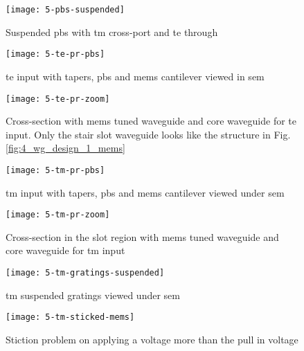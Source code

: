 \documentclass[../report.tex]{subfiles}
\begin{document}
\begin{figure}[H] %
	\centering
	\texttt{[image: 5-pbs-suspended]}
	\caption{Suspended \gls{pbs} with \gls{tm} cross-port and \gls{te} through}
	\label{fig:5-pbs-suspended}
\end{figure}

\begin{figure}[H] %
	\centering
	\texttt{[image: 5-te-pr-pbs]}
	\caption{\gls{te} input with tapers, \gls{pbs} and \gls{mems} cantilever viewed in \gls{sem}}
	\label{fig:5_te_pr_pbs}
\end{figure}

\begin{figure}[H] %
	\centering
	\texttt{[image: 5-te-pr-zoom]}
	\caption{Cross-section with \gls{mems} tuned waveguide and core waveguide for \gls{te} input. Only the stair slot waveguide looks like the structure in Fig. \ref{fig:4_wg_design_1_mems}}
	\label{fig:5_te_pr_zoom}
\end{figure}

\begin{figure}[H] %
	\centering
	\texttt{[image: 5-tm-pr-pbs]}
	\caption{\gls{tm} input with tapers, \gls{pbs} and \gls{mems} cantilever viewed under \gls{sem}}
	\label{fig:5_tm_pr_pbs}
\end{figure}

\begin{figure}[H] %
	\centering
	\texttt{[image: 5-tm-pr-zoom]}
	\caption{Cross-section in the slot region with \gls{mems} tuned waveguide and core waveguide for \gls{tm} input}
	\label{fig:5_tm_pr_zoom}
\end{figure}

\begin{figure}[h] %
	\centering
	\texttt{[image: 5-tm-gratings-suspended]}
	\caption{\gls{tm} suspended gratings viewed under \gls{sem}}
	\label{fig:5_tm_gratings_suspended}
\end{figure}

\begin{figure}[h] %
	\centering
	\texttt{[image: 5-tm-sticked-mems]}
	\caption{Stiction problem on applying a voltage more than the pull in voltage}
	\label{fig:5_tm_sticked_mems}
\end{figure}
\end{document}
